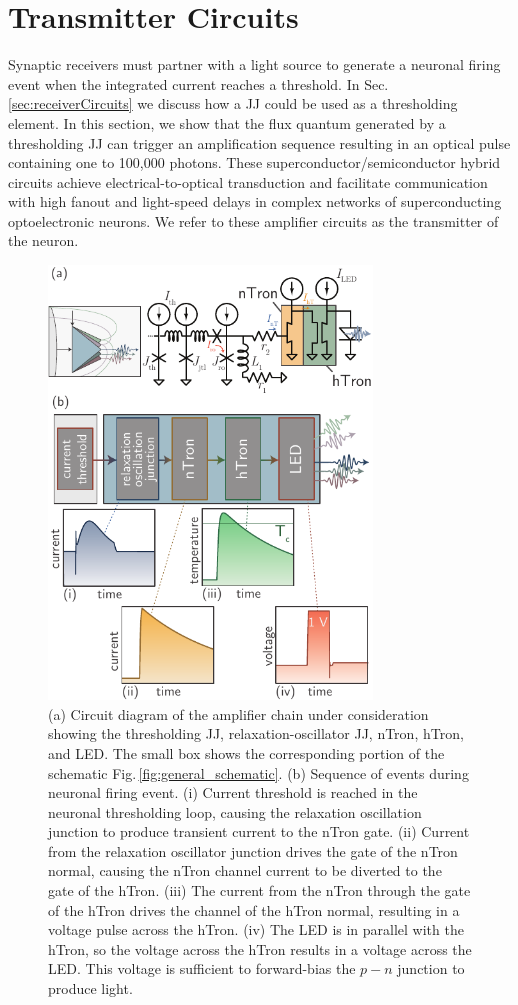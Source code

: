 \documentclass[twocolumn]{article}
\begin{document}
\section{\label{sec:transmitterCircuits}Transmitter Circuits}
Synaptic receivers must partner with a light source to generate a neuronal firing event when the integrated current reaches a threshold. In Sec.\,\ref{sec:receiverCircuits} we discuss how a JJ could be used as a thresholding element. In this section, we show that the flux quantum generated by a thresholding JJ can trigger an amplification sequence resulting in an optical pulse containing one to 100,000 photons. These superconductor/semiconductor hybrid circuits achieve electrical-to-optical transduction and facilitate communication with high fanout and light-speed delays in complex networks of superconducting optoelectronic neurons. We refer to these amplifier circuits as the transmitter of the neuron.

\begin{figure}[t!]
	\centerline{\includegraphics[width=8.6cm]{_transmitters_schematic_small.pdf}}
	\caption{\label{fig:transmitters_schematic}(a) Circuit diagram of the amplifier chain under consideration showing the thresholding JJ, relaxation-oscillator JJ, nTron, hTron, and LED. The small box shows the corresponding portion of the schematic Fig.\,\ref{fig:general_schematic}. (b) Sequence of events during neuronal firing event. (i) Current threshold is reached in the neuronal thresholding loop, causing the relaxation oscillation junction to produce transient current to the nTron gate. (ii) Current from the relaxation oscillator junction drives the gate of the nTron normal, causing the nTron channel current to be diverted to the gate of the hTron. (iii) The current from the nTron through the gate of the hTron drives the channel of the hTron normal, resulting in a voltage pulse across the hTron. (iv) The LED is in parallel with the hTron, so the voltage across the hTron results in a voltage across the LED. This voltage is sufficient to forward-bias the $p-n$ junction to produce light.}
\end{figure}
	
\end{document}

